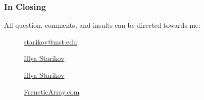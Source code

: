 \documentclass[xclolor=dvipsnames]{beamer}            %
\begin{document}
\begin{darkframes}
\begin{frame}
    \end{frame}

    \begin{frame}
        \frametitle{In Closing}

        All question, comments, and insults can be directed towards me:

        \begin{center}
            \begin{description}
                \item[\faComment] \href{mailto:starikov@mst.edu}{starikov@mst.edu}
                \item[\faLinkedin] \href{https://www.linkedin.com/in/illyastarikov/}{Illya Starikov}
                \item[\faGithub] \href{https://github.com/IllyaStarikov/}{Illya Starikov}
                \item[\faRss] \href{https://freneticarray.com/}{FreneticArray.com}
            \end{description}
        \end{center}

    \end{frame}
\end{darkframes}
\end{document}

